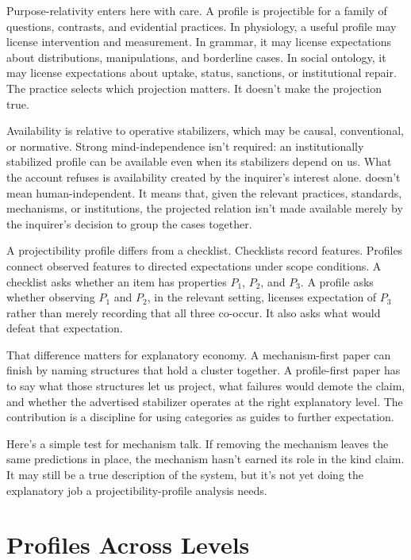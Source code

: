 \documentclass[12pt]{article}
\begin{document}
Purpose-relativity enters here with care. A profile is projectible for a family
of questions, contrasts, and evidential practices. In physiology, a useful
profile may license intervention and measurement. In grammar, it may license
expectations about distributions, manipulations, and borderline cases. In social
ontology, it may license expectations about uptake, status, sanctions, or
institutional repair. The practice selects which projection matters. It doesn't
make the projection true.

Availability is relative to operative stabilizers, which may be causal,
conventional, or normative. Strong mind-independence isn't required: an
institutionally stabilized profile can be available even when its stabilizers
depend on us. What the account refuses is availability created by the inquirer's
interest alone.  doesn't mean human-independent. It means that,
given the relevant practices, standards, mechanisms, or institutions, the
projected relation isn't made available merely by the inquirer's decision to
group the cases together.

A projectibility profile differs from a checklist. Checklists record
features. Profiles connect observed features to directed expectations under
scope conditions. A checklist asks whether an item has properties \(P_1\),
\(P_2\), and \(P_3\). A profile asks whether observing \(P_1\) and \(P_2\), in
the relevant setting, licenses expectation of \(P_3\) rather than merely
recording that all three co-occur. It also asks what would defeat that
expectation.

That difference matters for explanatory economy. A mechanism-first paper can
finish by naming structures that hold a cluster together. A profile-first paper
has to say what those structures let us project, what failures would demote the
claim, and whether the advertised stabilizer operates at the right explanatory
level. The contribution is a discipline for using categories as guides to
further expectation.

Here's a simple test for mechanism talk. If removing the mechanism leaves the
same predictions in place, the mechanism hasn't earned its role in the kind
claim. It may still be a true description of the system, but it's not yet doing
the explanatory job a projectibility-profile analysis needs.

\section{Profiles Across Levels}
\end{document}
